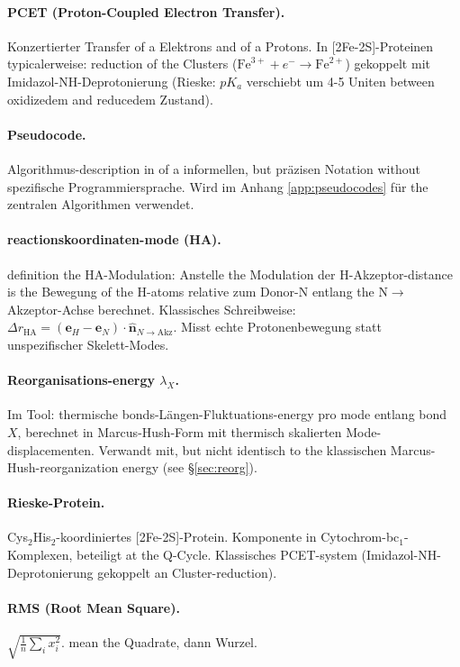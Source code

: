 \documentclass[11pt,a4paper,twoside]{article}
\theoremstyle{remark}
\begin{document}
\paragraph{PCET (Proton-Coupled Electron Transfer).}
Konzertierter Transfer of a Elektrons and of a Protons. In
[2Fe-2S]-Proteinen typicalerweise: reduction of the Clusters
($\text{Fe}^{3+} + e^- \to \text{Fe}^{2+}$) gekoppelt mit
Imidazol-NH-Deprotonierung (Rieske: $pK_a$ verschiebt um 4-5
Uniten between oxidizedem and reducedem Zustand).

\paragraph{Pseudocode.}
Algorithmus-description in of a informellen, but pr\"azisen
Notation without spezifische Programmiersprache. Wird im
Anhang \ref{app:pseudocodes} f\"ur the zentralen Algorithmen
verwendet.

\paragraph{reactionskoordinaten-mode (HA).}
definition the HA-Modulation: Anstelle the Modulation der
H-Akzeptor-distance is the Bewegung of the H-atoms relative zum
Donor-N entlang the N$\to$Akzeptor-Achse berechnet. Klassisches
Schreibweise: $\Delta r_\text{HA} = (\mathbf{e}_H - \mathbf{e}_N)
\cdot \hat{\mathbf{n}}_{N\to\text{Akz}}$. Misst echte
Protonenbewegung statt unspezifischer Skelett-Modes.

\paragraph{Reorganisations-energy $\lambda_X$.}
Im Tool: thermische bonds-L\"angen-Fluktuations-energy pro
mode entlang bond $X$, berechnet in Marcus-Hush-Form mit
thermisch skalierten Mode-displacementen. Verwandt mit, but nicht
identisch to the klassischen Marcus-Hush-reorganization energy
(see \S\ref{sec:reorg}).

\paragraph{Rieske-Protein.}
Cys$_2$His$_2$-koordiniertes [2Fe-2S]-Protein. Komponente in
Cytochrom-bc$_1$-Komplexen, beteiligt at the Q-Cycle. Klassisches
PCET-system (Imidazol-NH-Deprotonierung gekoppelt an
Cluster-reduction).

\paragraph{RMS (Root Mean Square).}
$\sqrt{\frac{1}{n}\sum_i x_i^2}$. mean the Quadrate, dann
Wurzel.
\end{document}
